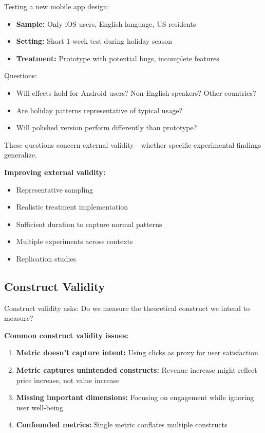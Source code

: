 \begin{example}
Testing a new mobile app design:

\begin{itemize}
    \item \textbf{Sample:} Only iOS users, English language, US residents
    \item \textbf{Setting:} Short 1-week test during holiday season
    \item \textbf{Treatment:} Prototype with potential bugs, incomplete features
\end{itemize}

Questions:
\begin{itemize}
    \item Will effects hold for Android users? Non-English speakers? Other countries?
    \item Are holiday patterns representative of typical usage?
    \item Will polished version perform differently than prototype?
\end{itemize}

These questions concern external validity—whether specific experimental findings generalize.
\end{example}

\textbf{Improving external validity:}

\begin{itemize}
    \item Representative sampling
    \item Realistic treatment implementation
    \item Sufficient duration to capture normal patterns
    \item Multiple experiments across contexts
    \item Replication studies
\end{itemize}

\subsection{Construct Validity}

Construct validity asks: Do we measure the theoretical construct we intend to measure?

\textbf{Common construct validity issues:}

\begin{enumerate}
    \item \textbf{Metric doesn't capture intent:} Using clicks as proxy for user satisfaction

    \item \textbf{Metric captures unintended constructs:} Revenue increase might reflect price increase, not value increase

    \item \textbf{Missing important dimensions:} Focusing on engagement while ignoring user well-being

    \item \textbf{Confounded metrics:} Single metric conflates multiple constructs
\end{enumerate}

